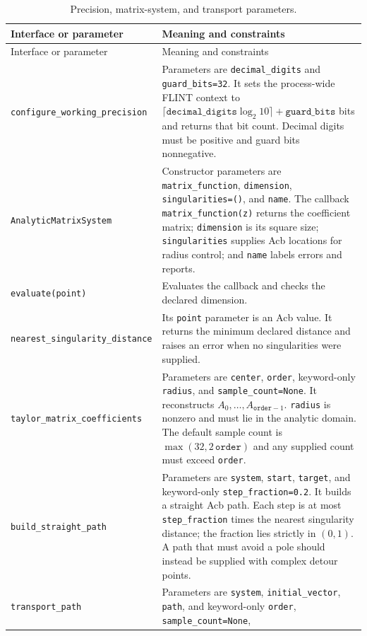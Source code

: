 \documentclass[11pt]{article}
\begin{document}
\small
\begin{longtable}{L{0.36\textwidth}L{0.58\textwidth}}
\caption{Precision, matrix-system, and transport parameters.}\label{tab:ordinary-api}\\
\toprule
Interface or parameter & Meaning and constraints \\
\midrule
\endfirsthead
\toprule
Interface or parameter & Meaning and constraints \\
\midrule
\endhead
\texttt{configure\_working\_precision} & Parameters are \texttt{decimal\_digits} and
\texttt{guard\_bits=32}.  It sets the process-wide FLINT context to
$\lceil\texttt{decimal\_digits}\log_2 10\rceil+\texttt{guard\_bits}$ bits and returns that bit
count.  Decimal digits must be positive and guard bits nonnegative. \\
\texttt{AnalyticMatrixSystem} & Constructor parameters are \texttt{matrix\_function},
\texttt{dimension}, \texttt{singularities=()}, and \texttt{name}.  The callback
\texttt{matrix\_function(z)} returns the coefficient matrix; \texttt{dimension} is its
square size; \texttt{singularities} supplies Acb locations for radius control; and
\texttt{name} labels errors and reports. \\
\texttt{evaluate(point)} & Evaluates the callback and checks the declared dimension. \\
\texttt{nearest\_singularity\_distance} & Its \texttt{point} parameter is an Acb value.  It
returns the minimum declared distance and raises an error when no singularities were
supplied. \\
\texttt{taylor\_matrix\_coefficients} & Parameters are \texttt{center}, \texttt{order},
keyword-only \texttt{radius}, and \texttt{sample\_count=None}.  It reconstructs
$A_0,\ldots,A_{\texttt{order}-1}$.  \texttt{radius} is nonzero and must lie in
the analytic domain.  The default sample count is $\max(32,2\,\texttt{order})$ and any
supplied count must exceed \texttt{order}. \\
\texttt{build\_straight\_path} & Parameters are \texttt{system}, \texttt{start},
\texttt{target}, and keyword-only \texttt{step\_fraction=0.2}.  It builds a straight Acb
path.  Each step is at most \texttt{step\_fraction} times the nearest
singularity distance; the fraction lies strictly in $(0,1)$.  A path that must avoid a pole
should instead be supplied with complex detour points. \\
\texttt{transport\_path} & Parameters are \texttt{system}, \texttt{initial\_vector},
\texttt{path}, and keyword-only \texttt{order}, \texttt{sample\_count=None},

\end{longtable}
\end{document}
